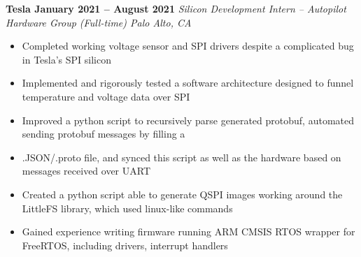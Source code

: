 \documentclass[../main.tex]{subfiles}
\begin{document}
%
\noindent\textbf{{\fontsize{\textFontSize}{\textFontBox}\selectfont Tesla \hfill January 2021 – August 2021}}
\vspace{\jobHeaderDist}\newline
%
{\fontsize{\textFontSize}{\textFontBox}\selectfont\emph{Silicon Development Intern – Autopilot Hardware Group (Full-time) \hfill Palo Alto, CA \hspace{0 cm}}}\vspace{\listHeight}\newline
%
%
\begin{itemize}
  \setlength{\itemindent}{-6mm}
  \vspace{\listItemDist}\item {\fontsize{\textFontSize}{\textFontBox}\selectfont Completed working voltage sensor and SPI drivers despite a complicated bug in Tesla’s SPI silicon}
  \vspace{\listItemDistTwo}\item {\fontsize{\textFontSize}{\textFontBox}\selectfont Implemented and rigorously tested a software architecture designed to funnel temperature and voltage data over SPI}
  \vspace{\listItemDistTwo}\item {\fontsize{\textFontSize}{\textFontBox}\selectfont Improved a python script to recursively parse generated protobuf, automated sending protobuf messages by filling a}
  \vspace{\listItemDistTwo}\item {\fontsize{\textFontSize}{\textFontBox}\selectfont .JSON/.proto file, and synced this script as well as the hardware based on messages received over UART}
  \vspace{\listItemDistTwo}\item {\fontsize{\textFontSize}{\textFontBox}\selectfont Created a python script able to generate QSPI images working around the LittleFS library, which used linux-like commands} %
  \vspace{-9 mm}\item {\fontsize{\textFontSize}{\textFontBox}\selectfont Gained experience writing firmware running ARM CMSIS RTOS wrapper for FreeRTOS, including drivers, interrupt handlers}
\end{itemize}
%
%
%
\end{document}
